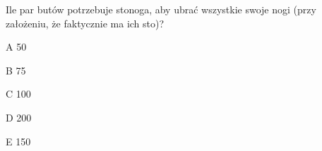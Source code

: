 \begin{tresc}
Ile par butów potrzebuje stonoga, aby ubrać wszystkie swoje nogi (przy założeniu, że faktycznie ma ich sto)?
\end{tresc}
\begin{wariant}{A} 50 \end{wariant}
\begin{wariant}{B} 75 \end{wariant}
\begin{wariant}{C} 100 \end{wariant}
\begin{wariant}{D} 200 \end{wariant}
\begin{wariant}{E} 150 \end{wariant}

